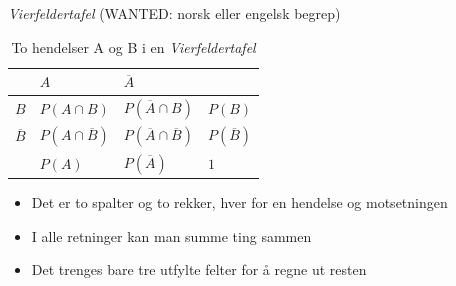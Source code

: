 \begin{frame}{\textit{Vierfeldertafel} (WANTED: norsk eller engelsk begrep)}
\begin{table}[h!]
\centering
\label{tab:prob_two_events}
\begin{tabular}{l|ll|l}
\cline{2-3}
                            & $A$            & $\overline{A}$            &                               \\ \hline
\multicolumn{1}{|l|}{$B$}   & $P(A\cap B)$   & $P(\overline{A}\cap B)$   & \multicolumn{1}{l|}{$P(B)$}   \\
\multicolumn{1}{|l|}{$\overline{B}$} & $P(A\cap \overline{B})$ & $P(\overline{A}\cap \overline{B})$ & \multicolumn{1}{l|}{$P(\overline{B})$} \\ \hline
                            & $P(A)$         & $P(\overline{A})$         & \multicolumn{1}{l|}{$1$}      \\ \cline{2-4} 
\end{tabular}
\caption{To hendelser A og B i en \textit{Vierfeldertafel}}
\end{table}
\pause
\begin{itemize}[<+->]
\item Det er to spalter og to rekker, hver for en hendelse og motsetningen
\item I alle retninger kan man summe ting sammen
\item Det trenges bare tre utfylte felter for å regne ut resten
\end{itemize}
\end{frame}

